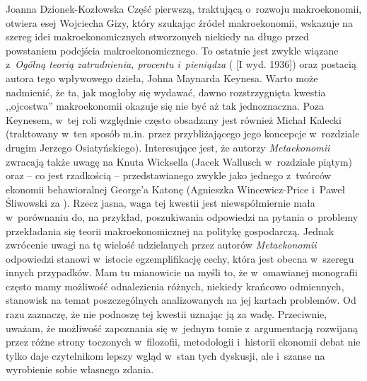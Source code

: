 \begin{recplenv}{Joanna Dzionek-Kozłowska}
Część pierwszą, traktującą o~rozwoju makroekonomii, otwiera esej Wojciecha Gizy, który szukając źródeł makroekonomii,
wskazuje na szereg idei makroekonomicznych stworzonych niekiedy na długo przed powstaniem podejścia makroekonomicznego.
To ostatnie jest zwykle wiązane z~\textit{Ogólną teorią zatrudnienia, procentu i~pieniądza}
(\cite{keynes_ogolna_2003} [I wyd. 1936])
oraz postacią autora tego wpływowego dzieła, Johna
Maynarda Keynesa. Warto może nadmienić, że ta, jak mogłoby się wydawać, dawno rozstrzygnięta kwestia ,,ojcostwa''
makroekonomii okazuje się nie być aż tak jednoznaczna. Poza Keynesem, w~tej roli względnie często obsadzany jest również
Michał Kalecki (traktowany w~ten sposób m.in. przez przybliżającego jego koncepcje w~rozdziale drugim Jerzego
Osiatyńskiego). Interesujące jest, że autorzy \textit{Metaekonomii} zwracają także uwagę na Knuta Wicksella (Jacek
Wallusch w~rozdziale piątym) oraz -- co jest rzadkością -- przedstawianego zwykle jako jednego z~twórców ekonomii
behawioralnej George'a Katonę (Agnieszka Wincewicz-Price i~Paweł Śliwowski za
\parencite{colander_complexity_2014}).
Rzecz jasna, waga tej kwestii jest niewspółmiernie mała w~porównaniu do, na przykład, poszukiwania
odpowiedzi na pytania o~problemy przekładania się teorii makroekonomicznej na politykę gospodarczą. Jednak zwrócenie
uwagi na tę wielość udzielanych przez autorów \textit{Metaekonomii} odpowiedzi stanowi w~istocie egzemplifikację cechy,
która jest obecna w~szeregu innych przypadków. Mam tu mianowicie na myśli to, że w~omawianej monografii często mamy
możliwość odnalezienia różnych, niekiedy krańcowo odmiennych, stanowisk na temat poszczególnych analizowanych na jej
kartach problemów. Od razu zaznaczę, że nie podnoszę tej kwestii uznając ją za wadę. Przeciwnie, uważam, że możliwość
zapoznania się w~jednym tomie z~argumentacją rozwijaną przez różne strony toczonych w~filozofii, metodologii i~historii
ekonomii debat nie tylko daje czytelnikom lepszy wgląd w~stan tych dyskusji, ale i~szanse na wyrobienie sobie własnego
zdania.


\end{recplenv}
